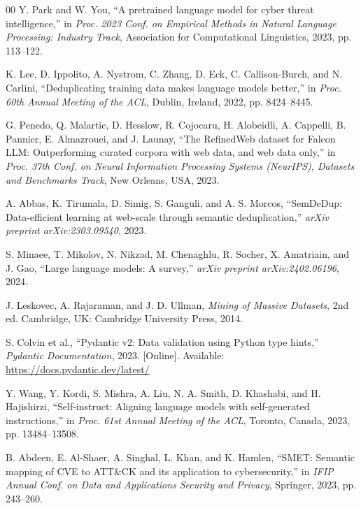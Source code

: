 \documentclass[conference]{IEEEtran}
\begin{document}
\begin{thebibliography}{00}
Y. Park and W. You,
``A pretrained language model for cyber threat intelligence,''
in \textit{Proc. 2023 Conf. on Empirical Methods in Natural Language
Processing: Industry Track},
Association for Computational Linguistics, 2023, pp. 113--122.

K. Lee, D. Ippolito, A. Nystrom, C. Zhang, D. Eck,
C. Callison-Burch, and N. Carlini,
``Deduplicating training data makes language models better,''
in \textit{Proc. 60th Annual Meeting of the ACL},
Dublin, Ireland, 2022, pp. 8424--8445.

G. Penedo, Q. Malartic, D. Hesslow, R. Cojocaru, H. Alobeidli,
A. Cappelli, B. Pannier, E. Almazrouei, and J. Launay,
``The RefinedWeb dataset for Falcon LLM: Outperforming curated
corpora with web data, and web data only,''
in \textit{Proc. 37th Conf. on Neural Information Processing Systems
(NeurIPS), Datasets and Benchmarks Track},
New Orleans, USA, 2023.

A. Abbas, K. Tirumala, D. Simig, S. Ganguli, and A. S. Morcos,
``SemDeDup: Data-efficient learning at web-scale through semantic
deduplication,''
\textit{arXiv preprint arXiv:2303.09540}, 2023.

S. Minaee, T. Mikolov, N. Nikzad, M. Chenaghlu, R. Socher,
X. Amatriain, and J. Gao,
``Large language models: A survey,''
\textit{arXiv preprint arXiv:2402.06196}, 2024.

J. Leskovec, A. Rajaraman, and J. D. Ullman,
\textit{Mining of Massive Datasets}, 2nd ed.
Cambridge, UK: Cambridge University Press, 2014.

S. Colvin et al.,
``Pydantic v2: Data validation using Python type hints,''
\textit{Pydantic Documentation}, 2023.
[Online]. Available: \url{https://docs.pydantic.dev/latest/}

Y. Wang, Y. Kordi, S. Mishra, A. Liu, N. A. Smith, D. Khashabi,
and H. Hajishirzi,
``Self-instruct: Aligning language models with self-generated
instructions,''
in \textit{Proc. 61st Annual Meeting of the ACL},
Toronto, Canada, 2023, pp. 13484--13508.

B. Abdeen, E. Al-Shaer, A. Singhal, L. Khan, and K. Hamlen,
``SMET: Semantic mapping of CVE to ATT\&CK and its application
to cybersecurity,''
in \textit{IFIP Annual Conf. on Data and Applications Security
and Privacy},
Springer, 2023, pp. 243--260.


\end{thebibliography}
\end{document}
